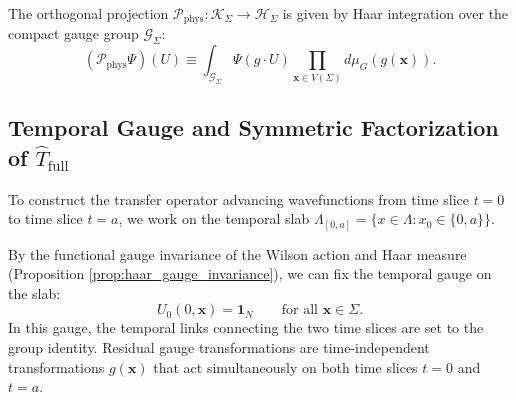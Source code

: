 The orthogonal projection $\mathcal{P}_{\mathrm{phys}} : \mathcal{K}_\Sigma \to \mathcal{H}_\Sigma$ is given by Haar integration over the compact gauge group $\mathcal{G}_\Sigma$:
\begin{equation}
\label{eq:physical_projection_haar}
(\mathcal{P}_{\mathrm{phys}} \Psi)(U) \equiv \int_{\mathcal{G}_\Sigma} \Psi(g \cdot U) \prod_{\mathbf{x} \in V(\Sigma)} d\mu_G(g(\mathbf{x})).
\end{equation}

\subsection{Temporal Gauge and Symmetric Factorization of $\hat{T}_{\mathrm{full}}$}
\label{subsec:temporal_gauge_factorization}

To construct the transfer operator advancing wavefunctions from time slice $t = 0$ to time slice $t = a$, we work on the temporal slab $\Lambda_{[0, a]} = \{x \in \Lambda : x_0 \in \{0, a\}\}$.

By the functional gauge invariance of the Wilson action and Haar measure (Proposition \ref{prop:haar_gauge_invariance}), we can fix the temporal gauge on the slab:
\begin{equation}
\label{eq:temporal_gauge_condition}
U_0(0, \mathbf{x}) = \mathbf{1}_N \qquad \text{for all } \mathbf{x} \in \Sigma.
\end{equation}
In this gauge, the temporal links connecting the two time slices are set to the group identity. Residual gauge transformations are time-independent transformations $g(\mathbf{x})$ that act simultaneously on both time slices $t = 0$ and $t = a$.


